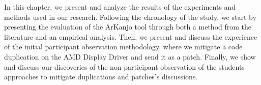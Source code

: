 \en 

In this chapter, we present and analyze the results of the experiments and methods 
used in our research. Following the chronology of the study, we start by presenting the 
evaluation of the ArKanjo tool through both a method from the literature and an empirical 
analysis. Then, we present and discuss the experience of the initial participant 
observation methodology, where we mitigate a code duplication on the AMD Display Driver 
and send it as a patch. Finally, we show and discuss our discoveries of the non-participant observation
of the students approaches to mitigate duplications and patches's discussions.







